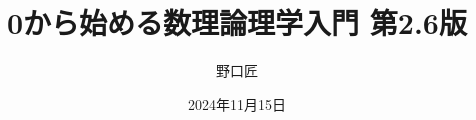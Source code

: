 \documentclass[10pt, a5j, ]{ltjsbook} %
\numberwithin{equation}{section}
\theoremstyle{definition}
\renewcommand{\presectionname}{\S}
\newcommand{\presubsectionname}{\S\S}
\begin{document}
\begin{titlepage}
	\title{0から始める数理論理学入門 第2.6版}
	\author{野口匠}
	\date{2024年11月15日}
	\maketitle
\end{titlepage}

\frontmatter



\tableofcontents

\mainmatter








\backmatter

\RenewDocumentCommand{\presectionname}{}{}
\RenewDocumentCommand{\presubsectionname}{}{}


\nocite{*}
\printbibliography[title=参考文献, heading=bibintoc]

\printindex[sidx]
\printindex[widx]

\newpage
\pagestyle{empty}
~
\newpage


\end{document}
